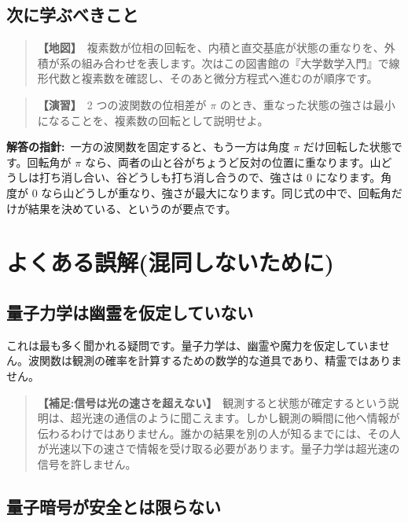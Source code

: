 \documentclass{article}
\begin{document}
\subsection{次に学ぶべきこと}

\begin{quote}
\textbf{【地図】}\ 複素数が位相の回転を、内積と直交基底が状態の重なりを、外積が系の組み合わせを表します。次はこの図書館の『大学数学入門』で線形代数と複素数を確認し、そのあと微分方程式へ進むのが順序です。
\end{quote}

\begin{quote}
\textbf{【演習】}\ 2 つの波関数の位相差が \(\pi\) のとき、重なった状態の強さは最小になることを、複素数の回転として説明せよ。
\end{quote}

\textbf{解答の指針:}\ 一方の波関数を固定すると、もう一方は角度 \(\pi\) だけ回転した状態です。回転角が \(\pi\) なら、両者の山と谷がちょうど反対の位置に重なります。山どうしは打ち消し合い、谷どうしも打ち消し合うので、強さは 0 になります。角度が 0 なら山どうしが重なり、強さが最大になります。同じ式の中で、回転角だけが結果を決めている、というのが要点です。

\section{よくある誤解(混同しないために)}

\subsection{量子力学は幽霊を仮定していない}

これは最も多く聞かれる疑問です。量子力学は、幽霊や魔力を仮定していません。波関数は観測の確率を計算するための数学的な道具であり、精霊ではありません。

\begin{quote}
\textbf{【補足:信号は光の速さを超えない】}\ 観測すると状態が確定するという説明は、超光速の通信のように聞こえます。しかし観測の瞬間に他へ情報が伝わるわけではありません。誰かの結果を別の人が知るまでには、その人が光速以下の速さで情報を受け取る必要があります。量子力学は超光速の信号を許しません。
\end{quote}

\subsection{量子暗号が安全とは限らない}
\end{document}
